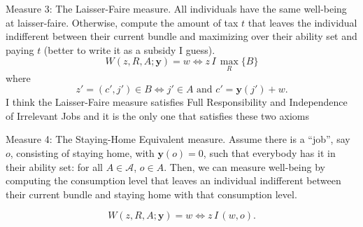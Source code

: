 \documentclass[12pt]{article}
\begin{document}
Measure 3: The Laisser-Faire measure. All individuals have the same well-being at laisser-faire. Otherwise, compute the amount of tax $t$ that leaves the individual indifferent between their current bundle and maximizing over their ability set and paying $t$ (better to write it as a subsidy I guess).
\begin{equation*}
\label{ }
W(z, R, A;\mathbf{y})=w\Leftrightarrow z\,I\,\max_R\{B\}
\end{equation*}
where 
\begin{equation*}
\label{ }
z'=(c',j')\in B\Leftrightarrow j'\in A \textrm{ and } c'=\mathbf{y}(j')+w.
\end{equation*}
I think the Laisser-Faire measure satisfies Full Responsibility and Independence of Irrelevant Jobs and it is the only one that satisfies these two axioms

Measure 4: The Staying-Home Equivalent measure. Assume there is a ``job'', say $o$, consisting of staying home, with $\mathbf{y}(o)=0$, such that everybody has it in their ability set: for all $A\in\mathcal{A}$, $o\in A$. Then, we can measure well-being by computing the consumption level that leaves an individual indifferent between their current bundle and staying home with that consumption level.

\begin{equation*}
\label{ }
W(z, R, A;\mathbf{y})=w\Leftrightarrow z\,I\,(w,o).
\end{equation*}
\end{document}
